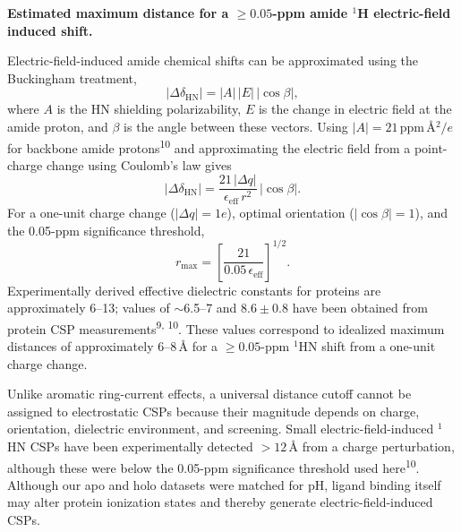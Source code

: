 \documentclass[11pt]{article}
\begin{document}
\textbf{Estimated maximum distance for a $\geq 0.05$-ppm amide $^{1}$H electric-field induced shift.}

Electric-field-induced amide chemical shifts can be approximated using the
Buckingham treatment,
\begin{equation*}
|\Delta\delta_{\mathrm{HN}}| = |A|\,|E|\,|\cos\beta|,
\end{equation*}
where $A$ is the HN shielding polarizability, $E$ is the change in electric
field at the amide proton, and $\beta$ is the angle between these vectors.
Using $|A|=21$\,ppm\,\AA{}$^{2}/e$ for backbone amide protons\textsuperscript{10}
and approximating the electric field from a point-charge change using Coulomb's
law gives
\begin{equation*}
|\Delta\delta_{\mathrm{HN}}| = \frac{21\,|\Delta q|}{\epsilon_{\mathrm{eff}}\,r^{2}}\,|\cos\beta|.
\end{equation*}
For a one-unit charge change ($|\Delta q|=1e$), optimal orientation
($|\cos\beta|=1$), and the 0.05-ppm significance threshold,
\begin{equation*}
r_{\max}=\left[\frac{21}{0.05\,\epsilon_{\mathrm{eff}}}\right]^{1/2}.
\end{equation*}
Experimentally derived effective dielectric constants for proteins are
approximately 6--13; values of $\sim$6.5--7 and $8.6\pm 0.8$ have been obtained
from protein CSP measurements\textsuperscript{9, 10}. These values correspond
to idealized maximum distances of approximately 6--8\,\AA{} for a
$\geq 0.05$-ppm $^{1}$HN shift from a one-unit charge change.

Unlike aromatic ring-current effects, a universal distance cutoff cannot be
assigned to electrostatic CSPs because their magnitude depends on charge,
orientation, dielectric environment, and screening. Small electric-field-induced
$^{1}$HN CSPs have been experimentally detected $>12$\,\AA{} from a charge
perturbation, although these were below the 0.05-ppm significance threshold used
here\textsuperscript{10}. Although our apo and holo datasets were matched for
pH, ligand binding itself may alter protein ionization states and thereby
generate electric-field-induced CSPs.
\end{document}
